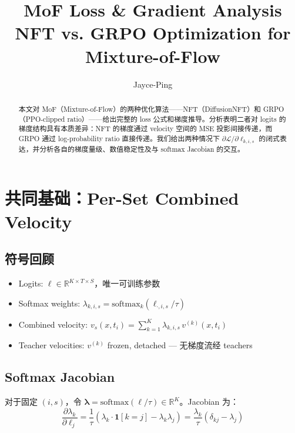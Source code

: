 \documentclass[11pt,a4paper]{article}
\title{\textbf{MoF Loss \& Gradient Analysis}\\[0.3em]
\large NFT vs. GRPO Optimization for Mixture-of-Flow}
\author{Jayce-Ping}
\date{}
\newcommand{\loss}{\mathcal{L}}
\newcommand{\R}{\mathbb{R}}
\newcommand{\softmax}{\mathrm{softmax}}
\theoremstyle{definition}
\begin{document}
\maketitle

\begin{abstract}
本文对 MoF（Mixture-of-Flow）的两种优化算法——NFT（DiffusionNFT）和 GRPO（PPO-clipped ratio）——给出完整的 loss 公式和梯度推导。分析表明二者对 logits 的梯度结构具有本质差异：NFT 的梯度通过 velocity 空间的 MSE 投影间接传递，而 GRPO 通过 log-probability ratio 直接传递。我们给出两种情况下 $\partial \loss / \partial \ell_{k,i,s}$ 的闭式表达，并分析各自的梯度量级、数值稳定性及与 softmax Jacobian 的交互。
\end{abstract}

\tableofcontents
\newpage

\section{共同基础：Per-Set Combined Velocity}
\label{sec:foundation}

\subsection{符号回顾}

\begin{itemize}[itemsep=2pt]
\item Logits: $\ell \in \R^{K \times T \times S}$，唯一可训练参数
\item Softmax weights: $\lambda_{k,i,s} = \softmax_k(\ell_{\cdot,i,s}/\tau)$
\item Combined velocity: $v_s(x, t_i) = \sum_{k=1}^K \lambda_{k,i,s}\, v^{(k)}(x, t_i)$
\item Teacher velocities: $v^{(k)}$ frozen, detached — 无梯度流经 teachers
\end{itemize}

\subsection{Softmax Jacobian}

对于固定 $(i, s)$，令 $\bm{\lambda} = \softmax(\bm{\ell}/\tau) \in \R^K$。Jacobian 为：
\begin{equation}
\frac{\partial \lambda_k}{\partial \ell_j} = \frac{1}{\tau}\left(\lambda_k \cdot \mathbf{1}[k=j] - \lambda_k \lambda_j\right) = \frac{\lambda_k}{\tau}\left(\delta_{kj} - \lambda_j\right)
\label{eq:softmax_jacobian}
\end{equation}
\end{document}
